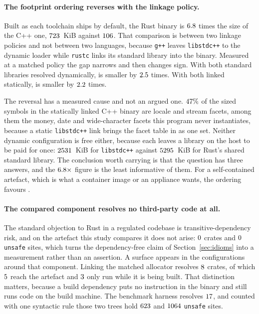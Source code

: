 \documentclass[english,oneside,a4paper,censored,csm,software-track-2020]{HYthesisML}
\begin{document}
\paragraph{The footprint ordering reverses with the linkage policy.}
Built as each toolchain ships by default, the Rust \texttt{\FootTarget} binary is
$6.8$ times the size of the C++ one, $723$~KiB against
$106$. That comparison is between two linkage policies and not between two languages,
because \texttt{g++} leaves \texttt{libstdc++} to the dynamic loader while \texttt{rustc} links its
standard library into the binary. Measured at a matched policy the gap narrows and then changes
sign. With both standard libraries resolved dynamically, \FootDynamicSmaller{} is smaller by
$2.5$ times. With both linked statically, \FootStaticSmaller{} is smaller by
$2.2$ times.

The reversal has a measured cause and not an argued one. $47\%$ of the sized
symbols in the statically linked C++ binary are locale and stream facets, among them the money,
date and wide-character facets this program never instantiates, because a static
\texttt{libstdc++} link brings the facet table in as one set. Neither dynamic configuration is
free either, because each leaves a library on the host to be paid for once: $2531$~KiB
for \texttt{libstdc++} against $5295$~KiB for Rust's shared standard library. The
conclusion worth carrying is that the question has three answers, and the $6.8\times$
figure is the least informative of them. For a self-contained artefact, which is what a container
image or an appliance wants, the ordering favours \FootStaticSmaller{}.

\paragraph{The compared component resolves no third-party code at all.}
The standard objection to Rust in a regulated codebase is transitive-dependency risk, and on the
artefact this study compares it does not arise: $0$ crates and $0$
\texttt{unsafe} sites, which turns the dependency-free claim of Section~\ref{sec:idioms} into a
measurement rather than an assertion. A surface appears in the configurations around that
component. Linking the matched allocator resolves $8$ crates, of which
$5$ reach the artefact and $3$ only run while it is being
built. That distinction matters, because a build dependency puts no instruction in the
binary and still runs code on the build machine. The benchmark harness resolves $17$,
and counted with one syntactic rule those two trees hold
$623$ and $1064$ \texttt{unsafe} sites.
\end{document}
